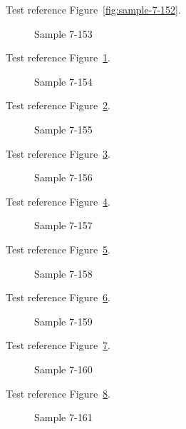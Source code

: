 Test reference Figure~\ref{fig:sample-7-152}.

\begin{figure}[tbhp]
\caption{Sample 7-153}
\label{fig:sample-7-153}
\end{figure}

Test reference Figure~\ref{fig:sample-7-153}.

\begin{figure}[tbhp]
\caption{Sample 7-154}
\label{fig:sample-7-154}
\end{figure}

Test reference Figure~\ref{fig:sample-7-154}.

\begin{figure}[tbhp]
\caption{Sample 7-155}
\label{fig:sample-7-155}
\end{figure}

Test reference Figure~\ref{fig:sample-7-155}.

\begin{figure}[tbhp]
\caption{Sample 7-156}
\label{fig:sample-7-156}
\end{figure}

Test reference Figure~\ref{fig:sample-7-156}.

\begin{figure}[tbhp]
\caption{Sample 7-157}
\label{fig:sample-7-157}
\end{figure}

Test reference Figure~\ref{fig:sample-7-157}.

\begin{figure}[tbhp]
\caption{Sample 7-158}
\label{fig:sample-7-158}
\end{figure}

Test reference Figure~\ref{fig:sample-7-158}.

\begin{figure}[tbhp]
\caption{Sample 7-159}
\label{fig:sample-7-159}
\end{figure}

Test reference Figure~\ref{fig:sample-7-159}.

\begin{figure}[tbhp]
\caption{Sample 7-160}
\label{fig:sample-7-160}
\end{figure}

Test reference Figure~\ref{fig:sample-7-160}.

\begin{figure}[tbhp]
\caption{Sample 7-161}
\label{fig:sample-7-161}
\end{figure}


